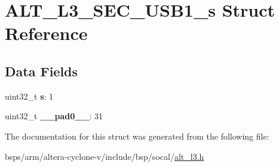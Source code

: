 \hypertarget{structALT__L3__SEC__USB1__s}{}\section{A\+L\+T\+\_\+\+L3\+\_\+\+S\+E\+C\+\_\+\+U\+S\+B1\+\_\+s Struct Reference}
\label{structALT__L3__SEC__USB1__s}
\subsection*{Data Fields}
\begin{DoxyCompactItemize}
\item 
\mbox{\label{structALT__L3__SEC__USB1__s_a3606646b0540fdc4be69f42b5fbb1372}} 
uint32\+\_\+t {\bfseries s}\+: 1
\item 
\mbox{\label{structALT__L3__SEC__USB1__s_a85f6ac1947147a25965ad1b262bf12b5}} 
uint32\+\_\+t {\bfseries \+\_\+\+\_\+pad0\+\_\+\+\_\+}\+: 31
\end{DoxyCompactItemize}


The documentation for this struct was generated from the following file\+:\begin{DoxyCompactItemize}
\item 
bsps/arm/altera-\/cyclone-\/v/include/bsp/socal/\mbox{\hyperlink{alt__l3_8h}{alt\+\_\+l3.\+h}}\end{DoxyCompactItemize}
